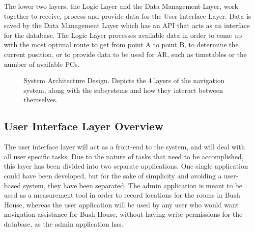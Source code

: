 The lower two layers, the Logic Layer and the Data Management Layer, work together to receive, process and provide data for the User Interface Layer. Data is saved by the Data Management Layer which has an API that acts as an interface for the database. The Logic Layer processes available data in order to come up with the most optimal route to get from point A to point B, to determine the current position, or to provide data to be used for AR, such as timetables or the number of available PCs.

\begin{figure}[H]
    \centering
    \centering
    \caption{System Architecture Design. Depicts the 4 layers of the navigation system, along with the subsystems and how they interact between themselves.}
    \label{fig:system-architecture-design}
\end{figure}

\subsection{User Interface Layer Overview}
The user interface layer will act as a front-end to the system, and will deal with all user specific tasks. Due to the nature of tasks that need to be accomplished, this layer has been divided into two separate applications. One single application could have been developed, but for the sake of simplicity and avoiding a user-based system, they have been separated. The admin application is meant to be used as a measurement tool in order to record locations for the rooms in Bush House, whereas the user application will be used by any user who would want navigation assistance for Bush House, without having write permissions for the database, as the admin application has.

